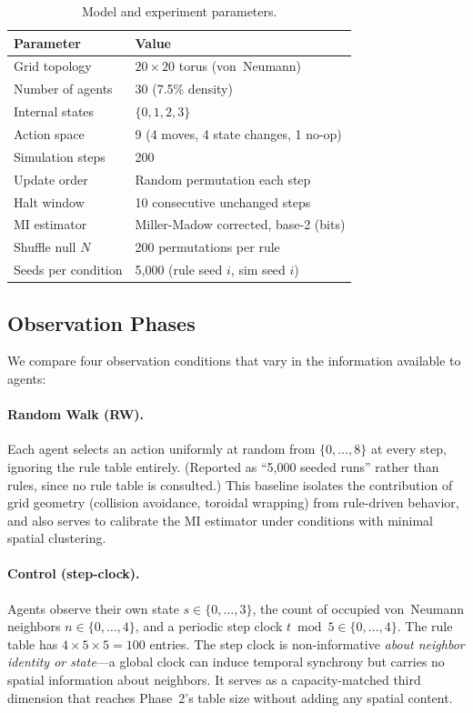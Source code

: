 \documentclass[letterpaper]{article}
\begin{document}
\begin{table}[htbp]
\centering
\caption{Model and experiment parameters.}
\label{tab:params}
\begin{tabular}{lp{}}
\toprule
Parameter & Value \\
\midrule
Grid topology       & $20 \times 20$ torus (von~Neumann) \\
Number of agents    & 30 (7.5\% density) \\
Internal states     & $\{0, 1, 2, 3\}$ \\
Action space        & 9 (4 moves, 4 state changes, 1 no-op) \\
Simulation steps    & 200 \\
Update order        & Random permutation each step \\
Halt window         & 10 consecutive unchanged steps \\
MI estimator        & Miller-Madow corrected, base-2 (bits) \\
Shuffle null $N$    & 200 permutations per rule \\
Seeds per condition & 5{,}000 (rule seed $i$, sim seed $i$) \\
\bottomrule
\end{tabular}
\end{table}

\subsection{Observation Phases}

We compare four observation conditions that vary in the information available
to agents:

\paragraph{Random Walk (RW).}
Each agent selects an action uniformly at random from $\{0, \ldots, 8\}$ at
every step, ignoring the rule table entirely.
(Reported as ``5{,}000 seeded runs'' rather than rules, since no rule table is
consulted.)
This baseline isolates the contribution of grid geometry (collision avoidance,
toroidal wrapping) from rule-driven behavior, and also serves to calibrate the
MI estimator under conditions with minimal spatial clustering.

\paragraph{Control (step-clock).}
Agents observe their own state $s \in \{0,\ldots,3\}$, the count of occupied
von~Neumann neighbors $n \in \{0,\ldots,4\}$, and a periodic step clock
$t \bmod 5 \in \{0,\ldots,4\}$. The rule table has $4 \times 5 \times 5 = 100$
entries. The step clock is non-informative \emph{about neighbor identity or state}---a
global clock can induce temporal synchrony but carries no spatial information
about neighbors.  It serves as a capacity-matched third dimension that reaches
Phase~2's table size without adding any spatial content.
\end{document}
